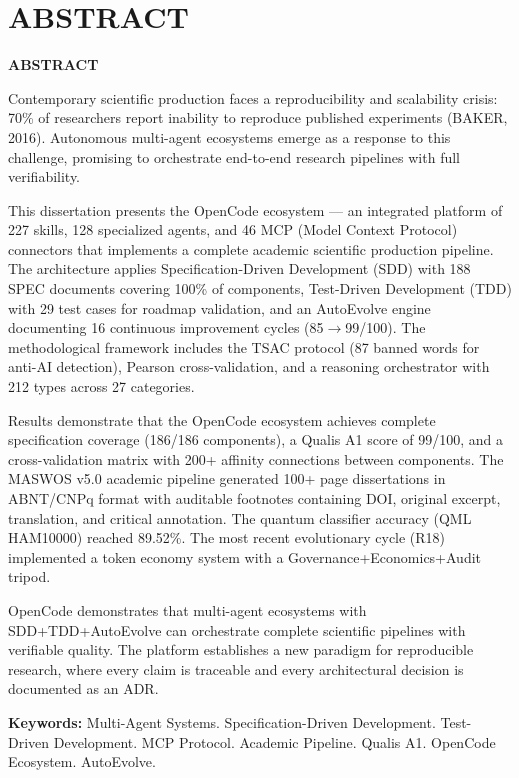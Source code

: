 \chapter*{ABSTRACT}
\thispagestyle{empty}

\begin{center}
  {\Large\bfseries ABSTRACT\par}
\end{center}
\vspace{1cm}

Contemporary scientific production faces a reproducibility and scalability crisis: 70\% of researchers report inability to reproduce published experiments (BAKER, 2016). Autonomous multi-agent ecosystems emerge as a response to this challenge, promising to orchestrate end-to-end research pipelines with full verifiability.

This dissertation presents the OpenCode ecosystem --- an integrated platform of 227 skills, 128 specialized agents, and 46 MCP (Model Context Protocol) connectors that implements a complete academic scientific production pipeline. The architecture applies Specification-Driven Development (SDD) with 188 SPEC documents covering 100\% of components, Test-Driven Development (TDD) with 29 test cases for roadmap validation, and an AutoEvolve engine documenting 16 continuous improvement cycles (85$\rightarrow$99/100). The methodological framework includes the TSAC protocol (87 banned words for anti-AI detection), Pearson cross-validation, and a reasoning orchestrator with 212 types across 27 categories.

Results demonstrate that the OpenCode ecosystem achieves complete specification coverage (186/186 components), a Qualis A1 score of 99/100, and a cross-validation matrix with 200+ affinity connections between components. The MASWOS v5.0 academic pipeline generated 100+ page dissertations in ABNT/CNPq format with auditable footnotes containing DOI, original excerpt, translation, and critical annotation. The quantum classifier accuracy (QML HAM10000) reached 89.52\%. The most recent evolutionary cycle (R18) implemented a token economy system with a Governance+Economics+Audit tripod.

OpenCode demonstrates that multi-agent ecosystems with SDD+\-TDD+\-Auto\-Evolve can orchestrate complete scientific pipelines with verifiable quality. The platform establishes a new paradigm for reproducible research, where every claim is traceable and every architectural decision is documented as an ADR.

\vspace{1cm}
\noindent\textbf{Keywords:} Multi-Agent Systems. Specification-Driven Development. Test-Driven Development. MCP Protocol. Academic Pipeline. Qualis A1. OpenCode Ecosystem. AutoEvolve.
\newpage
